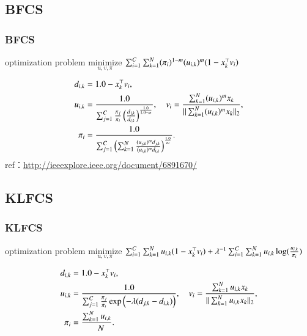 \documentclass[fleqn,dvipdfmx,10pt]{beamer}
\begin{document}
\subsection{BFCS}
\begin{frame}\frametitle{BFCS}
  \begin{block}{optimization problem}
    $\underset{u,v,\pi}{\text{minimize}}$
    $\sum_{i=1}^C\sum_{k=1}^N(\pi_{i})^{1-m}(u_{i,k})^m(1-x_k^{\top}v_i)$ \centering\\
  \end{block}
  \begin{align*}
    d_{i,k}&=1.0-x_k^{\top}v_i,\\
    u_{i,k}&=\frac{1.0}{\sum_{j=1}^C\frac{\pi_{j}}{\pi_{i}}\left(\frac{d_{j,k}}{d_{i,k}}\right)^\frac{1.0}{1.0-m}},\quad
    v_{i}=\frac{\sum_{k=1}^N (u_{i,k})^m x_{k}}{||\sum_{k=1}^N (u_{i,k})^mx_{k}||_2},\\
    \pi_{i}&=\frac{1.0}{\sum_{j=1}^C\left(\sum_{k=1}^N\frac{(u_{j,k})^md_{j,k}}{(u_{i,k})^md_{i,k}}\right)^{\frac{1.0}{m}}}.
  \end{align*}
  ref：\url{http://ieeexplore.ieee.org/document/6891670/}\centering
\end{frame}

\subsection{KLFCS}
\begin{frame}\frametitle{KLFCS}%
  \begin{block}{optimization problem}
    $\underset{u,v,\pi}{\text{minimize}}$
    $\sum_{i=1}^C\sum_{k=1}^Nu_{i,k}(1-x_k^{\top}v_i)+\lambda^{-1}\sum_{i=1}^C\sum_{k=1}^Nu_{i,k}\log(\frac{u_{i,k}}{\pi_{i}})$\centering\\
  \end{block}
  \begin{align*}
    d_{i,k}&=1.0-x_k^{\top}v_i,\\
    u_{i,k}&=\frac{1.0}{\sum_{j=1}^C\frac{\pi_{j}}{\pi_{i}}\exp\left(-\lambda(d_{j,k}-d_{i,k})\right)},\quad
    v_{i}=\frac{\sum_{k=1}^N u_{i,k} x_{k}}{||\sum_{k=1}^N u_{i,k}x_{k}||_2},\\
    \pi_{i}&=\frac{\sum_{k=1}^Nu_{i,k}}{\quad N}.
  \end{align*}
\end{frame}
\end{document}
